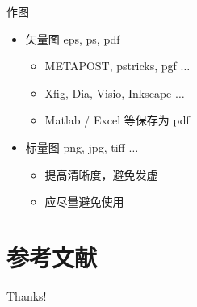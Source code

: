\documentclass{beamer}
\begin{document}
	\begin{frame}{作图}
		\begin{itemize}
			\item 矢量图 eps, ps, pdf
			\begin{itemize}
				\item METAPOST, pstricks, pgf $\ldots$
				\item Xfig, Dia, Visio, Inkscape $\ldots$
				\item Matlab / Excel 等保存为 pdf
			\end{itemize}
			\item 标量图 png, jpg, tiff $\ldots$
			\begin{itemize}
				\item 提高清晰度，避免发虚
				\item 应尽量避免使用
			\end{itemize}
		\end{itemize}
	\end{frame}
	
	\section{参考文献}
	
	\begin{frame}[allowframebreaks]
		
		
	\end{frame}
	
	\begin{frame}
		\begin{center}
			{\Huge\calligra Thanks!}
		\end{center}
	\end{frame}
	
\end{document}
